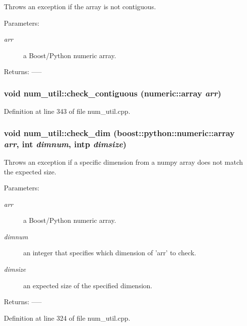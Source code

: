 Throws an exception if the array is not contiguous. \begin{Desc}
\item[Parameters:]
\begin{description}
\item[{\em arr}]a Boost/Python numeric array. \end{description}
\end{Desc}
\begin{Desc}
\item[Returns:]-----\end{Desc}
\subsubsection{\setlength{\rightskip}{0pt plus 5cm}void num\_\-util::check\_\-contiguous (numeric::array {\em arr})}\label{namespacenum__util_a47}




Definition at line 343 of file num\_\-util.cpp.
\subsubsection{\setlength{\rightskip}{0pt plus 5cm}void num\_\-util::check\_\-dim (boost::python::numeric::array {\em arr}, int {\em dimnum}, intp {\em dimsize})}\label{namespacenum__util_a45}


Throws an exception if a specific dimension from a numpy array does not match the expected size. \begin{Desc}
\item[Parameters:]
\begin{description}
\item[{\em arr}]a Boost/Python numeric array. \item[{\em dimnum}]an integer that specifies which dimension of 'arr' to check. \item[{\em dimsize}]an expected size of the specified dimension. \end{description}
\end{Desc}
\begin{Desc}
\item[Returns:]-----\end{Desc}


Definition at line 324 of file num\_\-util.cpp.
